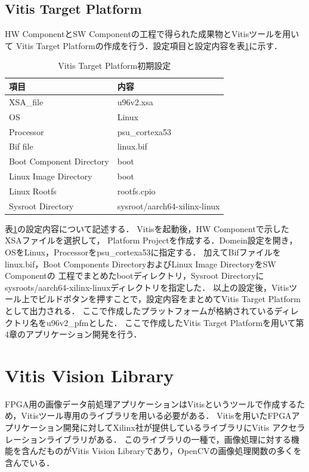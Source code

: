 \documentclass[11pt,a4j]{jreport}
\begin{document}
\subsection{Vitis Target Platform}
HW ComponentとSW Componentの工程で得られた成果物とVitisツールを用いて
Vitis Target Platformの作成を行う．設定項目と設定内容を表\ref{vtpset}に示す．
\begin{table}[H]
  \caption{Vitis Target Platform初期設定}
  \label{vtpset}
  \centering
  \begin{tabular}{ll}
    \hline
    項目 & 内容 \\
    \hline
    XSA_file & u96v2.xsa\\
    OS & Linux \\
    Processor & psu_cortexa53\\
    Bif file & linux.bif \\
    Boot Component Directory & boot \\
    Linux Image Directory & boot \\
    Linux Rootfs & rootfs.cpio \\
    Sysroot Directory & sysroot/aarch64-xilinx-linux \\
    \hline
    \end{tabular}
\end{table}
表\ref{vtpset}の設定内容について記述する．
Vitisを起動後，HW Componentで示したXSAファイルを選択して，
Platform Projectを作成する．Domein設定を開き，OSをLinux，Processorをpsu_cortexa53に指定する．
加えてBifファイルをlinux.bif，Boot Components DirectoryおよびLinux Image DirectoryをSW Componentの
工程でまとめたbootディレクトリ，Sysroot Directoryにsysroots/aarch64-xilinx-linuxディレクトリを指定した．
以上の設定後，Vitisツール上でビルドボタンを押すことで，設定内容をまとめてVitis Target Platformとして出力される．
ここで作成したプラットフォームが格納されているディレクトリ名をu96v2_pfmとした．
ここで作成したVitis Target Platformを用いて第4章のアプリケーション開発を行う．

\section{Vitis Vision Library}
FPGA用の画像データ前処理アプリケーションはVitisというツールで作成するため，Vitisツール専用のライブラリを用いる必要がある．
Vitisを用いたFPGAアプリケーション開発に対してXilinx社が提供しているライブラリにVitis アクセラレーションライブラリがある．
このライブラリの一種で，画像処理に対する機能を含んだものがVitis Vision Library\cite{vvl}であり，OpenCVの画像処理関数の多くを含んでいる．
\end{document}
